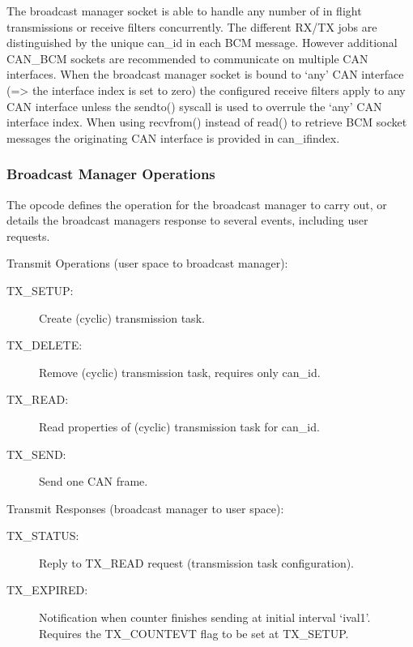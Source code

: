 \documentclass[a4paper,8pt,english]{sphinxmanual}
\begin{document}
The broadcast manager socket is able to handle any number of in flight
transmissions or receive filters concurrently. The different RX/TX jobs are
distinguished by the unique can\_id in each BCM message. However additional
CAN\_BCM sockets are recommended to communicate on multiple CAN interfaces.
When the broadcast manager socket is bound to `any' CAN interface (=\textgreater{} the
interface index is set to zero) the configured receive filters apply to any
CAN interface unless the sendto() syscall is used to overrule the `any' CAN
interface index. When using recvfrom() instead of read() to retrieve BCM
socket messages the originating CAN interface is provided in can\_ifindex.


\subsubsection{Broadcast Manager Operations}
\label{networking/can:broadcast-manager-operations}
The opcode defines the operation for the broadcast manager to carry out,
or details the broadcast managers response to several events, including
user requests.

Transmit Operations (user space to broadcast manager):
\begin{description}
\item[{TX\_SETUP:}] \leavevmode
Create (cyclic) transmission task.

\item[{TX\_DELETE:}] \leavevmode
Remove (cyclic) transmission task, requires only can\_id.

\item[{TX\_READ:}] \leavevmode
Read properties of (cyclic) transmission task for can\_id.

\item[{TX\_SEND:}] \leavevmode
Send one CAN frame.

\end{description}

Transmit Responses (broadcast manager to user space):
\begin{description}
\item[{TX\_STATUS:}] \leavevmode
Reply to TX\_READ request (transmission task configuration).

\item[{TX\_EXPIRED:}] \leavevmode
Notification when counter finishes sending at initial interval
`ival1'. Requires the TX\_COUNTEVT flag to be set at TX\_SETUP.

\end{description}
\end{document}
